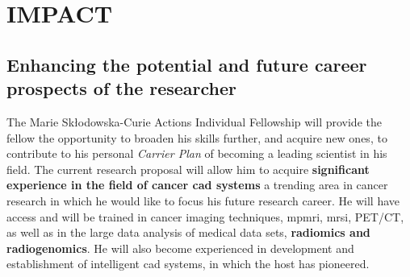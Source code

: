 \section{IMPACT}
\label{sec:impact}

\subsection{Enhancing the potential and future career prospects of the researcher}
\label{sec:enhancement}


The Marie Sk\l{}odowska-Curie Actions Individual Fellowship will provide the fellow the opportunity to broaden his skills further, and acquire new ones, to contribute to his personal \emph{Carrier Plan} of becoming a leading scientist in his field.
The current research proposal will allow him to acquire \textbf{significant experience in the field of cancer \ac{cad} systems} a trending area in cancer research in which he would like to focus his future research career.
He will have access and will be trained in cancer imaging techniques, \ac{mpmri}, \ac{mrsi}, PET/CT, as well as in the large data analysis of medical data sets, \textbf{radiomics and radiogenomics}.
He will also become experienced in development and establishment of intelligent \ac{cad} systems, in which the host has pioneered. 

